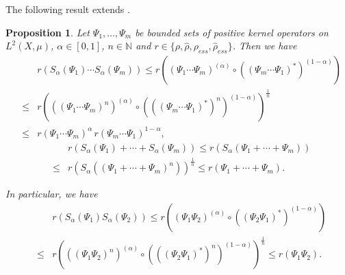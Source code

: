 \documentclass[12pt, reqno]{amsart}
\newtheorem{proposition}[theorem]{Proposition}
\theoremstyle{definition}
\theoremstyle{remark}
\numberwithin{equation}{section}
\newcommand{\NN}{\mathbb{N}}
\begin{document}
The following result extends  \cite[Proposition 3.2]{BP21}.
\begin{proposition}
Let $\Psi_1, \ldots ,\Psi_m$ be bounded sets of positive kernel operators on $L^2(X,\mu)$, $\alpha \in [0,1]$, $n \in \NN$ and $r\in \{ \rho , \hat{\rho} , \rho _{ess}, \hat{\rho} _{ess}\}$. Then we have
\begin{eqnarray}
\nonumber
& & r(S_{\alpha} (\Psi_{1}) \cdots  S_{\alpha}(\Psi_{m})) 
\le r\left((\Psi_1 \cdots \Psi_m )^{(\alpha)} \circ ((\Psi_m \cdots \Psi_1)^*)^{(1-\alpha)}\right) \\
\nonumber
&\le & r\left(((\Psi_1 \cdots \Psi_m )^n)^{(\alpha)} \circ (((\Psi_m \cdots \Psi_1)^*)^n)^{(1-\alpha)}\right)^{\frac{1}{n}}\\
&\le & r(\Psi_1 \cdots \Psi_m )^{\alpha} \, r(\Psi_m \cdots \Psi_1 )^{1-\alpha} ,
\label{freiheit}
\end{eqnarray}
\begin{eqnarray}
\nonumber
& & r(S_{\alpha}(\Psi_1)+ \cdots + S_{\alpha}(\Psi_m)) \le r\left(S_{\alpha}(\Psi_1+ \cdots+ \Psi_m)\right) \\
&\le & r\left(S_{\alpha}((\Psi_1+ \cdots+ \Psi_m)^{n})\right)^{\frac{1}{n}}
\le r(\Psi_1+ \cdots+ \Psi_m).
\label{widerstand}
\end{eqnarray}

In particular, we have
\begin{eqnarray}
\nonumber
& & r\left(S_{\alpha}(\Psi_{1}) S_{\alpha}(\Psi_{2})\right) \le r\left((\Psi_1 \Psi_2 )^{(\alpha)} \circ ((\Psi_2 \Psi_1)^*)^{(1-\alpha)}  \right) \\
&\le & r\left(((\Psi_1 \Psi_2 )^n)^{(\alpha)} \circ (((\Psi_2 \Psi_1)^*)^n)^{(1-\alpha)}\right)^{\frac{1}{n}}\le r(\Psi_1 \Psi_2) .
\label{special}
\end{eqnarray}
\label {geom_sym}
\end{proposition}
\end{document}
